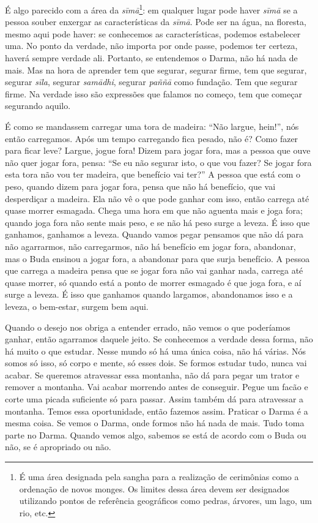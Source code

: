 É algo parecido com a área da \textit{sīm\=a}\footnote{É uma área
designada pela sangha para a realização de cerimônias como a ordenação
de novos monges. Os limites dessa área devem ser designados utilizando
pontos de referência geográficos como pedras, árvores, um lago, um rio,
etc.}: em qualquer lugar pode haver \textit{sīm\=a} se a pessoa
souber enxergar as características da \textit{sīm\=a}. Pode ser na
água, na floresta, mesmo aqui pode haver: se conhecemos as
características, podemos estabelecer uma. No ponto da verdade, não
importa por onde passe, podemos ter certeza, haverá sempre verdade ali.
Portanto, se entendemos o Darma, não há nada de mais. Mas na hora de
aprender tem que segurar, segurar firme, tem que segurar, segurar
\textit{sīla}, segurar \textit{sam\=adhi}, segurar \textit{paññ\=a}
como fundação. Tem que segurar firme. Na verdade isso são expressões
que falamos no começo, tem que começar segurando aquilo. 

É como se mandassem carregar uma tora de madeira: “Não largue,
hein!”, nós então carregamos. Após um tempo carregando fica pesado, não
é? Como fazer para ficar leve? Largue, jogue fora! Dizem para jogar
fora, mas a pessoa que ouve não quer jogar fora, pensa: “Se eu não
segurar isto, o que vou fazer? Se jogar fora esta tora não vou ter
madeira, que benefício vai ter?” A pessoa que está com o peso, quando
dizem para jogar fora, pensa que não há benefício, que vai desperdiçar
a madeira. Ela não vê o que pode ganhar com isso, então carrega até
quase morrer esmagada. Chega uma hora em que não aguenta mais e joga
fora; quando joga fora não sente mais peso, e se não há peso surge a
leveza. É isso que ganhamos, ganhamos a leveza. Quando vamos pegar
pensamos que não dá para não agarrarmos, não carregarmos, não há
benefício em jogar fora, abandonar, mas o Buda ensinou a jogar fora, a
abandonar para que surja benefício. A pessoa que carrega a madeira
pensa que se jogar fora não vai ganhar nada, carrega até quase morrer,
só quando está a ponto de morrer esmagado é que joga fora, e aí surge a
leveza. É isso que ganhamos quando largamos, abandonamos isso e a
leveza, o bem-estar, surgem bem aqui. 

Quando o desejo nos obriga a entender errado, não vemos o que
poderíamos ganhar, então agarramos daquele jeito. Se conhecemos a
verdade dessa forma, não há muito o que estudar. Nesse mundo só há uma
única coisa, não há várias. Nós somos só isso, só corpo e mente, só
esses dois. Se formos estudar tudo, nunca vai acabar. Se queremos
atravessar essa montanha, não dá para pegar um trator e remover a
montanha. Vai acabar morrendo antes de conseguir. Pegue um facão e
corte uma picada suficiente só para passar. Assim também dá para
atravessar a montanha. Temos essa oportunidade, então fazemos assim.
Praticar o Darma é a mesma coisa. Se vemos o Darma, onde formos não há
nada de mais. Tudo toma parte no Darma. Quando vemos algo, sabemos se
está de acordo com o Buda ou não, se é apropriado ou não. 

